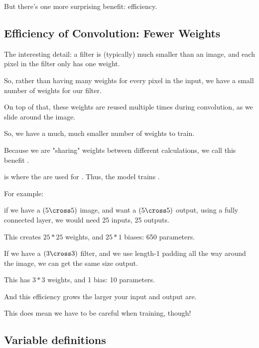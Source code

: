         But there's one more surprising benefit: efficiency.
    
    \subsection{Efficiency of Convolution: Fewer Weights}
        
        The interesting detail: a filter is (typically) much smaller than an image, and each pixel in the filter only has one weight. 
        
        So, rather than having many weights for every pixel in the input, we have a small number of weights for our filter.
        
        On top of that, these weights are reused multiple times during convolution, as we slide around the image.
        
        So, we have a much, much smaller number of weights to train.
        
        Because we are "sharing" weights between different calculations, we call this benefit .
        
        \begin{definition}
             is where the  are used for . Thus, the model trains .
        \end{definition}
        
        For example:
        
        if we have a $(5 \cross 5)$ image, and want a $(5 \cross 5)$ output, using a fully connected layer, we would need 25 inputs, 25 outputs. 
         
        This creates $25*25$ weights, and $25*1$ biases: 650 parameters.
         
        If we have a $(3 \cross 3)$ filter, and we use length-1 padding all the way around the image, we can get the same size output.
         
        This has $3*3$ weights, and 1 bias: 10 parameters.
        
        And this efficiency grows the larger your input and output are.
        
        This does mean we have to be careful when training, though!

    \subsection{Variable definitions}
    
